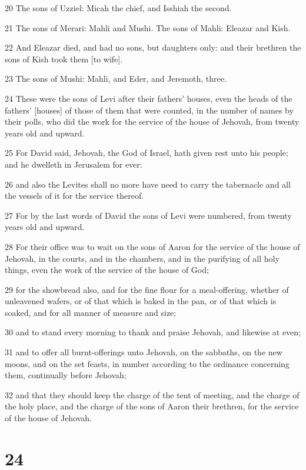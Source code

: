 \par 20 The sons of Uzziel: Micah the chief, and Isshiah the second.
\par 21 The sons of Merari: Mahli and Mushi. The sons of Mahli: Eleazar and Kish.
\par 22 And Eleazar died, and had no sons, but daughters only: and their brethren the sons of Kish took them [to wife].
\par 23 The sons of Mushi: Mahli, and Eder, and Jeremoth, three.
\par 24 These were the sons of Levi after their fathers' houses, even the heads of the fathers' [houses] of those of them that were counted, in the number of names by their polls, who did the work for the service of the house of Jehovah, from twenty years old and upward.
\par 25 For David said, Jehovah, the God of Israel, hath given rest unto his people; and he dwelleth in Jerusalem for ever:
\par 26 and also the Levites shall no more have need to carry the tabernacle and all the vessels of it for the service thereof.
\par 27 For by the last words of David the sons of Levi were numbered, from twenty years old and upward.
\par 28 For their office was to wait on the sons of Aaron for the service of the house of Jehovah, in the courts, and in the chambers, and in the purifying of all holy things, even the work of the service of the house of God;
\par 29 for the showbread also, and for the fine flour for a meal-offering, whether of unleavened wafers, or of that which is baked in the pan, or of that which is soaked, and for all manner of measure and size;
\par 30 and to stand every morning to thank and praise Jehovah, and likewise at even;
\par 31 and to offer all burnt-offerings unto Jehovah, on the sabbaths, on the new moons, and on the set feasts, in number according to the ordinance concerning them, continually before Jehovah;
\par 32 and that they should keep the charge of the tent of meeting, and the charge of the holy place, and the charge of the sons of Aaron their brethren, for the service of the house of Jehovah.

\chapter{24}


